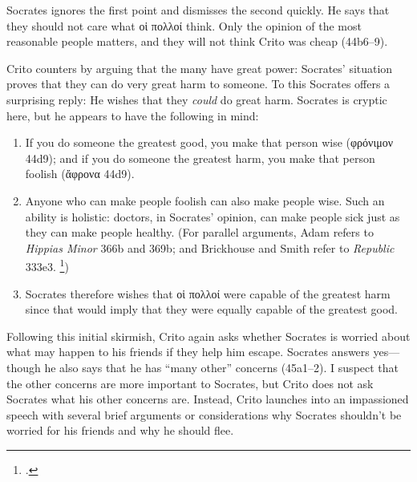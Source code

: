 \documentclass[12pt,letterpaper]{article}
\begin{document}
Socrates ignores the first point and dismisses the second quickly.
He says that they should not care what \textgreek{οἱ πολλοί} think.
Only the opinion of the most reasonable people matters, and they will not think Crito was cheap (44b6--9).

Crito counters by arguing that the many have great power: Socrates' situation proves that they can do very great harm to someone.
To this Socrates offers a surprising reply: He wishes that they \emph{could} do great harm.
Socrates is cryptic here, but he appears to have the following in mind:

\begin{enumerate}

    \item If you do someone the greatest good, you make that person wise (\textgreek{φρόνιμον} 44d9); and if you do someone the greatest harm, you make that person foolish (\textgreek{ἄφρονα} 44d9).

    \item Anyone who can make people foolish can also make people wise.
        Such an ability is holistic: doctors, in Socrates' opinion, can make people sick just as they can make people healthy.
        (For parallel arguments, Adam refers to \textit{Hippias Minor} 366b and 369b; and Brickhouse and Smith refer to \textit{Republic} 333e3.%
        \footcites[][on 44d]{adam1988-crito}[][200]{brickhouse-smith2004-plato-trial-of-socrates})

    \item Socrates therefore wishes that \textgreek{οἱ πολλοί} were capable of the greatest harm since that would imply that they were equally capable of the greatest good.

\end{enumerate}

Following this initial skirmish, Crito again asks whether Socrates is worried about what may happen to his friends if they help him escape.
Socrates answers yes---though he also says that he has ``many other'' concerns (45a1--2).
I suspect that the other concerns are more important to Socrates, but Crito does not ask Socrates what his other concerns are.
Instead, Crito launches into an impassioned speech with several brief arguments or considerations why Socrates shouldn't be worried for his friends and why he should flee.
\end{document}
